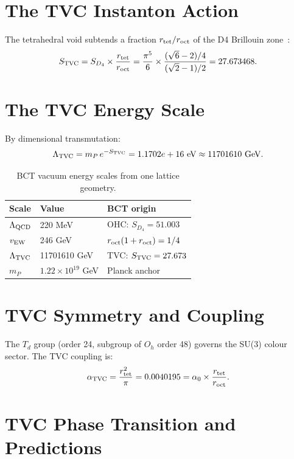 \documentclass[aps,prl,preprint,superscriptaddress,floatfix]{revtex4-2}
\begin{document}
\section{The TVC Instanton Action}

The tetrahedral void subtends a fraction $r_{\rm tet}/r_{\rm oct}$ of the D4
Brillouin zone~\cite{bct22,az2}:
\begin{equation}
S_{\rm TVC} = S_{D_4}\times\frac{r_{\rm tet}}{r_{\rm oct}}
= \frac{\pi^5}{6}\times\frac{(\sqrt{6}-2)/4}{(\sqrt{2}-1)/2} = 27.673468.
\end{equation}

\section{The TVC Energy Scale}

By dimensional transmutation:
\begin{equation}
\Lambda_{\rm TVC} = m_P\,e^{-S_{\rm TVC}} = 1.1702e+16~\text{eV}
\approx 11701610~\text{GeV}.
\end{equation}

\begin{table}[h]
\centering
\caption{BCT vacuum energy scales from one lattice geometry.}
\begin{tabular}{lll}
\toprule
Scale & Value & BCT origin \\
\midrule
$\Lambda_{\rm QCD}$ & 220 MeV & OHC: $S_{D_4}=51.003$ \\
$v_{\rm EW}$ & 246 GeV & $r_{\rm oct}(1+r_{\rm oct})=1/4$ \\
$\Lambda_{\rm TVC}$ & 11701610 GeV & TVC: $S_{\rm TVC}=27.673$ \\
$m_P$ & $1.22\times10^{19}$ GeV & Planck anchor \\
\bottomrule
\end{tabular}
\end{table}

\section{TVC Symmetry and Coupling}

The $T_d$ group (order 24, subgroup of $O_h$ order 48) governs the SU(3) colour
sector. The TVC coupling is:
\begin{equation}
\alpha_{\rm TVC} = \frac{r_{\rm tet}^2}{\pi} = 0.0040195 = \alpha_0\times\frac{r_{\rm tet}}{r_{\rm oct}}.
\end{equation}

\section{TVC Phase Transition and Predictions}
\end{document}
